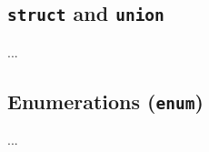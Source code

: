 \documentclass[titlepage,letterpaper]{article}
\begin{document}
\subsection{{\tt struct} and {\tt union}}

...

\subsection{Enumerations ({\tt enum})}

...

%


\end{document}
